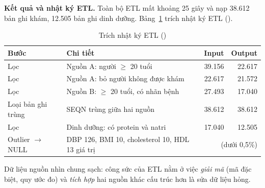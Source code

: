 \textbf{Kết quả và nhật ký ETL.} Toàn bộ ETL mất khoảng 25 giây và nạp 38.612 bản ghi khám, 12.505 bản ghi dinh dưỡng. Bảng~\ref{tab:etllog} trích nhật ký ETL ().
\begin{table}[H]
\renewcommand{\arraystretch}{1.35}\setlength{\extrarowheight}{3pt}
\centering
\caption[Trích nhật ký ETL]{Trích nhật ký ETL ()}\label{tab:etllog}
\small
\begin{tabular}{|l|l|r|r|}
\hline
\textbf{Bước} & \textbf{Chi tiết} & \textbf{Input} & \textbf{Output} \\ \hline
Lọc & Nguồn A: người $\geq$ 20 tuổi & 39.156 & 22.617 \\ \hline
Lọc & Nguồn A: bỏ người không được khám & 22.617 & 21.572 \\ \hline
Lọc & Nguồn B: $\geq$ 20 tuổi, có nhãn bệnh & 27.493 & 17.040 \\ \hline
Loại bản ghi trùng & SEQN trùng giữa hai nguồn & 38.612 & 38.612 \\ \hline
Lọc & Dinh dưỡng: có protein và natri & 17.040 & 12.505 \\ \hline
Outlier $\rightarrow$ NULL & DBP 126, BMI 10, cholesterol 10, HDL 13 giá trị & \multicolumn{2}{r|}{(dưới 0,5\%)} \\ \hline
\end{tabular}
\end{table}
Dữ liệu nguồn nhìn chung sạch: công sức của ETL nằm ở việc \emph{giải mã} (mã đặc biệt, quy ước đo) và \emph{tích hợp} hai nguồn khác cấu trúc hơn là sửa dữ liệu hỏng.
